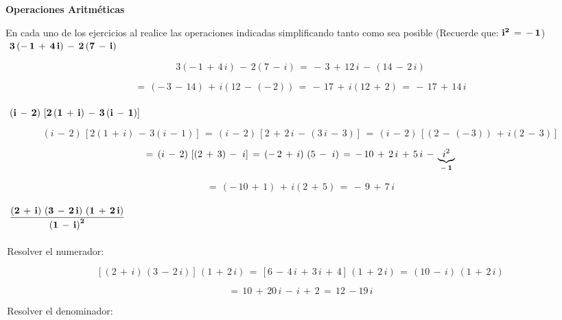 \documentclass[a4paper,11pt,openany]{book}
\begin{document}
\begin{center}
\textbf{Operaciones Aritméticas}
\end{center}

En cada uno de los ejercicios  al  realice las operaciones indicadas simplificando tanto como sea posible (Recuerde que: $\bf{i^{2}\,=\,-\,1}$)\\

\textcolor{ao(english)}{}\,\quad\,$\bf{3\left(-\,1\,+\,4\,i\right)\,-\,2\left(7\,-\,i\right)}$

$$3\left(-\,1\,+\,4\,i\right)\,-\,2\left(7\,-\,i\right)\,=\,-\,3\,+\,12\,i\,-\,\left(14\,-\,2\,i\right)$$

$$=\,\left(-\,3\,-\,14\right)\,+\,i\left(12\,-\,(-\,2)\right)\,=\,-\,17\,+\,i\left(12\,+\,2\right)\,=\,-\,17\,+\,14\,i$$\\

\textcolor{ao(english)}{}\,\quad\,$\bf{\left(i\,-\,2\right)\,\left[2\left(1\,+\,i\right)\,-\,3\left(i\,-\,1\right)\right]}$

$$\left(i\,-\,2\right)\,\left[2\left(1\,+\,i\right)\,-\,3\left(i\,-\,1\right)\right]\,=\,\left(i\,-\,2\right)\,\left[2\,+\,2\,i\,-\,\left(3\,i\,-\,3\right)\right]\,=\,\left(i\,-\,2\right)\,\left[\left(2\,-\,(-\,3)\right)\,+\,i\left(2\,-\,3\right)\right]$$

$$=\,\left(i\,-\,2\right)\,\left[\left(2\,+\,3\right)\,-\,\,i\right]\,=\,\left(-\,2\,+\,i\right)\,\left(5\,-\,\,i\right)\,=\,-\,10\,+\,2\,i\,+\,5\,i\,-\,\underbrace{i^{2}}_{\bf{-\,1}}$$

$$=\,\left(-\,10\,+\,1\right)\,+\,i\left(2\,+\,5\right)\,=\,-\,9\,+\,7\,i$$\\

\textcolor{ao(english)}{}\,\quad\,$\bf{\dfrac{\left(2\,+\,i\right)\,\left(3\,-\,2\,i\right)\,\left(1\,+\,2\,i\right)}{\left(1\,-\,i\right)^{2}}}$\\
\\

\textcolor{ao(english)}{}\,Resolver el numerador:

$$\left[\left(2\,+\,i\right)\,\left(3\,-\,2\,i\right)\right]\,\left(1\,+\,2\,i\right)\,=\,\left[6\,-\,4\,i\,+\,3\,i\,+\,4\right]\,\left(1\,+\,2\,i\right)\,=\,\left(10\,-\,i\right)\,\left(1\,+\,2\,i\right)$$

$$=\,10\,+\,20\,i\,-\,i\,+\,2\,=\,12\,-19\,i$$

\textcolor{ao(english)}{}\,Resolver el denominador: 
\end{document}
